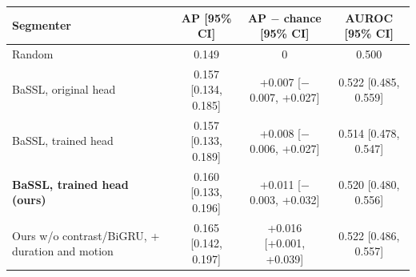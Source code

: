 \begin{tabular}{@{}lccc@{}}
\toprule
Segmenter & AP [95\% CI] & AP $-$ chance [95\% CI] & AUROC [95\% CI] \\
\midrule
Random & 0.149 & 0 & 0.500 \\
BaSSL, original head & 0.157 [0.134, 0.185] & +0.007 [$-$0.007, +0.027] & 0.522 [0.485, 0.559] \\
BaSSL, trained head & 0.157 [0.133, 0.189] & +0.008 [$-$0.006, +0.027] & 0.514 [0.478, 0.547] \\
\textbf{BaSSL, trained head (ours)} & 0.160 [0.133, 0.196] & +0.011 [$-$0.003, +0.032] & 0.520 [0.480, 0.556] \\
Ours w/o contrast/BiGRU, + duration and motion & 0.165 [0.142, 0.197] & +0.016 [+0.001, +0.039] & 0.522 [0.486, 0.557] \\
\bottomrule
\end{tabular}
